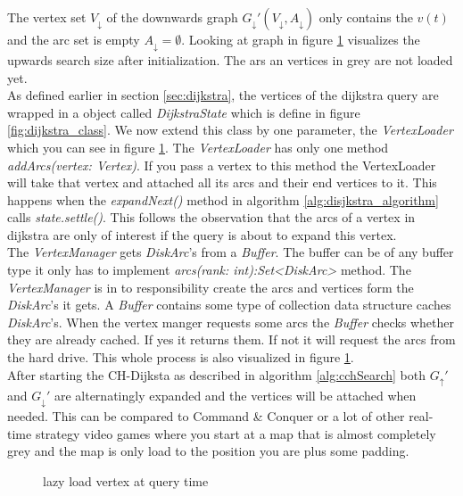 The vertex set $V_\downarrow$ of the downwards graph $G_\downarrow'(V_\downarrow, A_\downarrow)$ only contains the $v(t)$ and the arc set is empty $A_\downarrow = \emptyset$.
Looking at graph in figure \ref{fig:lazy_load_vertex} visualizes the upwards search size after initialization.
The ars an vertices in grey are not loaded yet.
\\
As defined earlier in section \ref{sec:dijkstra}, the vertices of the dijkstra query are wrapped in a object called \textit{DijkstraState} which is define in figure \ref{fig:dijkstra_class}.
We now extend this class by one parameter, the \textit{VertexLoader} which you can see in figure \ref{fig:lazy_load_vertex}.
The \textit{VertexLoader} has only one method \textit{addArcs(vertex: Vertex)}.
If you pass a vertex to this method the VertexLoader will take that vertex and attached all its arcs and their end vertices to it.
This happens when the \textit{expandNext()} method in algorithm \ref{alg:disjkstra_algorithm} calls \textit{state.settle()}.
This follows the observation that the arcs of a vertex in dijkstra are only of interest if the query is about to expand this vertex.
\\
The \textit{VertexManager} gets \textit{DiskArc}'s from a \textit{Buffer}.
The buffer can be of any buffer type it only has to implement \textit{arcs(rank: int):Set<DiskArc>} method.
The \textit{VertexManager} is in to responsibility create the arcs and vertices form the \textit{DiskArc}'s it gets.
A \textit{Buffer} contains some type of collection data structure caches \textit{DiskArc}'s.
When the vertex manger requests some arcs the \textit{Buffer} checks whether they are already cached.
If yes it returns them.
If not it will request the arcs from the hard drive.
This whole process is also visualized in figure \ref{fig:lazy_load_vertex}.
\\
After starting the CH-Dijksta as described in algorithm \ref{alg:cchSearch} both $G_\uparrow'$ and $G_\downarrow'$ are alternatingly expanded and the vertices will be attached when needed.
This can be compared to Command \& Conquer or a lot of other real-time strategy video games where you start at a map that is almost completely grey and the map is only load to the position you are plus some padding.

\begin{figure}
    \centering
    
    \caption{lazy load vertex at query time}
    \label{fig:lazy_load_vertex}
\end{figure}


%    
